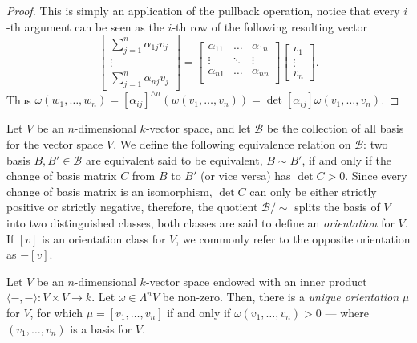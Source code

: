 \begin{proof}
This is simply an application of the pullback operation, notice that every
\(i\)-th argument can be seen as the \(i\)-th row of the following resulting
vector
\[
  \begin{bmatrix}
    \sum_{j=1}^n \alpha_{1 j} v_j \\ \vdots \\ \sum_{j=1}^n \alpha_{n j} v_j
  \end{bmatrix}
  =
  \begin{bmatrix}
    \alpha_{11} &\dots &\alpha_{1n} \\
    \vdots &\ddots &\vdots \\
    \alpha_{n1} &\dots &\alpha_{nn} \\
  \end{bmatrix}
  \begin{bmatrix}
    v_1 \\ \vdots \\ v_n
  \end{bmatrix}.
\]
Thus \(\omega(w_1, \dots, w_n) = [\alpha_{ij}]^{\wedge n}(w(v_{1}, \dots, v_n))
= \det [\alpha_{ij}] \omega(v_1, \dots, v_n)\).
\end{proof}

\begin{definition}[Orientation]
\label{def:orientation}
Let \(V\) be an \(n\)-dimensional \(k\)-vector space, and let \(\mathcal B\) be
the collection of all basis for the vector space \(V\). We define the following
equivalence relation on \(\mathcal B\): two basis \(B, B' \in \mathcal B\) are
equivalent said to be equivalent, \(B \sim B'\), if and only if the change of
basis matrix \(C\) from \(B\) to \(B'\) (or vice versa) has \(\det C >
0\). Since every change of basis matrix is an isomorphism, \(\det C\) can only
be either strictly positive or strictly negative, therefore, the quotient
\(\mathcal B/{\sim}\) splits the basis of \(V\) into two distinguished classes,
both classes are said to define an \emph{orientation} for \(V\). If \([v]\) is
an orientation class for \(V\), we commonly refer to the opposite orientation
as \(-[v]\).
\end{definition}

\begin{corollary}\label{cor:unique-orientation}
Let \(V\) be an \(n\)-dimensional \(k\)-vector space endowed with an inner
product \(\langle -, - \rangle: V \times V \to k\). Let \(\omega \in \Lambda^n
V\) be non-zero. Then, there is a \emph{unique orientation} \(\mu\) for \(V\),
for which \(\mu = [v_1, \dots, v_n]\) if and only if \(\omega(v_1, \dots, v_n) >
0\) --- where \((v_1, \dots, v_n)\) is a basis for \(V\).
\end{corollary}

